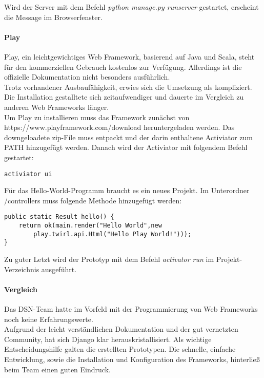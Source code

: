 Wird der Server mit dem Befehl \textit{python manage.py runserver} gestartet, erscheint die Message im Browserfenster.

\paragraph{Play}
Play, ein leichtgewichtiges Web Framework, basierend auf Java und Scala, steht für den kommerziellen Gebrauch kostenlos zur Verfügung. Allerdings ist die offizielle Dokumentation nicht besonders ausführlich.\\
Trotz vorhandener Ausbaufähigkeit, erwies sich die Umsetzung als kompliziert. Die Installation gestalltete sich zeitaufwendiger und dauerte im Vergleich zu anderen Web Frameworks länger.\cite{PLAY}\\

Um Play zu installieren muss das Framework zunächst von\\
https://www.playframework.com/download heruntergeladen werden. Das downgeloadete zip-File muss entpackt und der darin enthaltene Activiator zum PATH hinzugefügt werden. Danach wird der Activiator mit folgendem Befehl gestartet\cite{PLAYCON}:
\begin{lstlisting}[caption={Konifiguration von Play \cite{PLAYCON}}]
activiator ui
\end{lstlisting}

Für das \grqq{}Hello-World\grqq{}-Programm braucht es ein neues Projekt. Im Unterordner /controllers muss folgende Methode hinzugefügt werden:

\begin{lstlisting}[caption={Play Hello-World \cite{PLAYCON}}]
public static Result hello() {
	return ok(main.render("Hello World",new
		play.twirl.api.Html("Hello Play World!")));
}
\end{lstlisting}

Zu guter Letzt wird der Prototyp mit dem Befehl \textit{activator run} im Projekt-Verzeichnis ausgeführt.

\paragraph{Vergleich}
Das DSN-Team hatte im Vorfeld mit der Programmierung von Web Frameworks noch keine Erfahrungswerte. \\
Aufgrund der leicht verständlichen Dokumentation und der gut vernetzten Community, hat sich Django klar herauskristallisiert. Als wichtige Entscheidungshilfe galten die erstellten Prototypen. Die schnelle, einfache Entwicklung, sowie die Installation und Konfiguration des Frameworks, hinterließ beim Team einen guten Eindruck.

